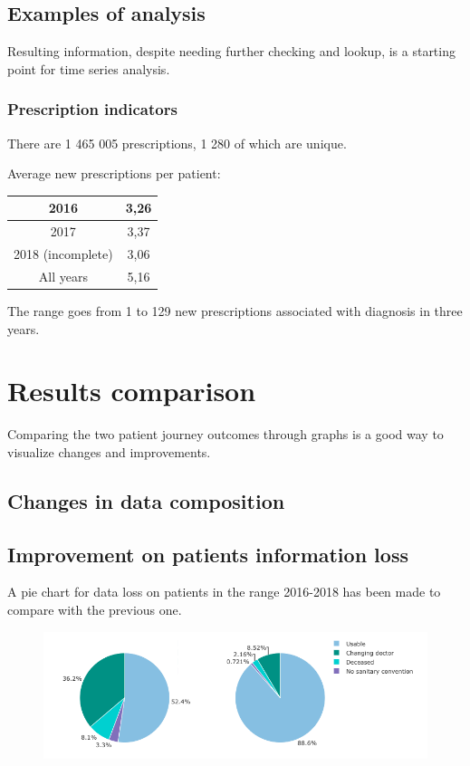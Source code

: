\subsection{Examples of analysis}
Resulting information, despite needing further checking and lookup, is a starting point for time series analysis.

\subsubsection{Prescription indicators}
There are 1 465 005 prescriptions, 1 280 of which are unique.

Average new prescriptions per patient:
\begin{center}
	\small
	\begin{tabular}{c|c}
		2016 & 3,26 \\
		\hline
		2017 & 3,37 \\
		\hline
		2018 (incomplete) & 3,06 \\
		\hline
		All years & 5,16
	\end{tabular}
\end{center}

The range goes from 1 to 129 new prescriptions associated with diagnosis in three years.

\section{Results comparison}
Comparing the two patient journey outcomes through graphs is a good way to visualize changes and improvements.

\subsection{Changes in data composition}

\subsection{Improvement on patients information loss}
A pie chart for data loss on patients in the range 2016-2018 has been made to compare with the previous one.

\begin{figure}[h]
	\centering
	\includegraphics[scale=0.6]{images/patients-pies.png}
\end{figure}

